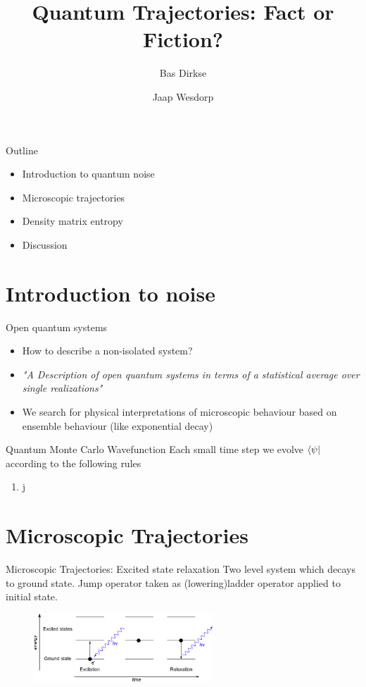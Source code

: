 \documentclass{beamer}
\title[]{Quantum Trajectories: Fact or Fiction?}
\institute[]{Delft University of Technology, The Netherlands}
\author{Bas Dirkse \and Jaap Wesdorp}
\begin{document}
{
\frame{\titlepage}
}

{

}

\begin{frame}{Outline}
\begin{itemize}
	\item Introduction to quantum noise
	\item Microscopic trajectories
	\item Density matrix entropy
	\item Discussion
\end{itemize}
\end{frame}

\section{Introduction to noise}
\begin{frame}{Open quantum systems}
	\begin{itemize}
		\item 	How to describe a non-isolated system?
		\item 	\emph{"A Description of open quantum systems in terms of a statistical average over single realizations"}
		\item We search for physical interpretations of microscopic behaviour based on ensemble behaviour (like exponential decay)
	\end{itemize}

\end{frame}

\begin{frame}{Quantum Monte Carlo Wavefunction}
		Each small time step we evolve $\bra{\psi}$ according to the following rules
		\begin{enumerate}
			\item j
		\end{enumerate}
\end{frame}


\section{Microscopic Trajectories}
\begin{frame}{Microscopic Trajectories: Excited state relaxation}
	Two level system which decays to ground state.
	Jump operator taken as (lowering)ladder operator applied to initial state.
	\begin{figure}[h]
		\centering
		\includegraphics[width=0.6\textwidth]{figs/relaxation.png}
		\label{fig:digraph}
	\end{figure}
\end{frame}
\end{document}
